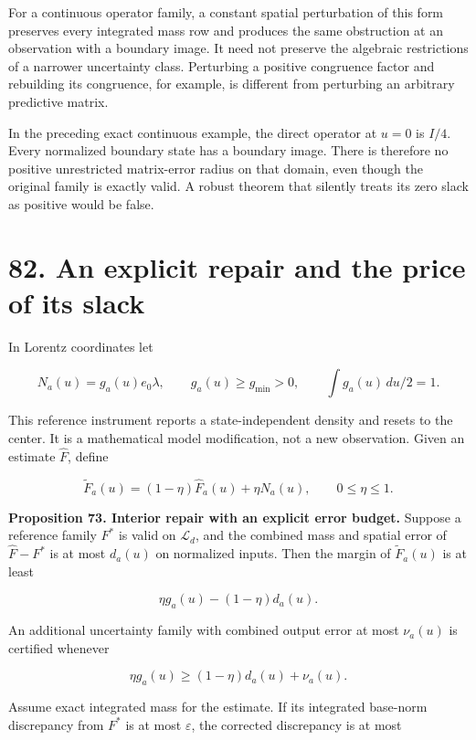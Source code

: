 \documentclass[11pt,letterpaper]{article}
\begin{document}
For a continuous operator family, a constant spatial perturbation of
this form preserves every integrated mass row and produces the same
obstruction at an observation with a boundary image. It need not
preserve the algebraic restrictions of a narrower uncertainty class.
Perturbing a positive congruence factor and rebuilding its congruence,
for example, is different from perturbing an arbitrary predictive
matrix.

In the preceding exact continuous example, the direct operator at
\(u=0\) is \(I/4\). Every normalized boundary state has a boundary
image. There is therefore no positive unrestricted matrix-error radius
on that domain, even though the original family is exactly valid. A
robust theorem that silently treats its zero slack as positive would be
false.

\section{82. An explicit repair and the price of its
slack}\label{an-explicit-repair-and-the-price-of-its-slack}

In Lorentz coordinates let

\[
N_a(u)=g_a(u)e_0\lambda,\qquad
 g_a(u)\geq g_{\min}>0,\qquad \int g_a(u)\,du/2=1.
\]

This reference instrument reports a state-independent density and resets
to the center. It is a mathematical model modification, not a new
observation. Given an estimate \(\widehat F\), define

\[
\widetilde F_a(u)=(1-\eta)\widehat F_a(u)+\eta N_a(u),
\qquad 0\leq\eta\leq1.
\]

\textbf{Proposition 73. Interior repair with an explicit error budget.}
Suppose a reference family \(F^*\) is valid on \(\mathcal L_d\), and the
combined mass and spatial error of \(\widehat F-F^*\) is at most
\(d_a(u)\) on normalized inputs. Then the margin of
\(\widetilde F_a(u)\) is at least

\[
\boxed{\eta g_a(u)-(1-\eta)d_a(u).}
\]

An additional uncertainty family with combined output error at most
\(\nu_a(u)\) is certified whenever

\[
\eta g_a(u)\geq(1-\eta)d_a(u)+\nu_a(u).
\]

Assume exact integrated mass for the estimate. If its integrated
base-norm discrepancy from \(F^*\) is at most \(\varepsilon\), the
corrected discrepancy is at most
\end{document}
